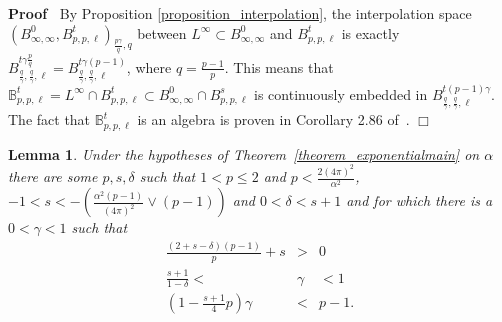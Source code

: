 \documentclass[a4paper,10pt]{article}
\newenvironment{proof}{\noindent\textbf{Proof\ }}{\hspace*{\fill}$\Box$\medskip}
\newtheorem{lemma}[theorem]{Lemma}
\begin{document}
\begin{proof}
  By Proposition \ref{proposition_interpolation}, the interpolation space
  $(B^0_{\infty, \infty}, B^t_{p, p, \ell})_{\frac{p \gamma}{q}, q}$ between
  $L^{\infty} \subset B^0_{\infty, \infty}$ and $B^t_{p, p, \ell}$ is exactly
  $B^{t \gamma \frac{p}{q}}_{\frac{q}{\gamma}, \frac{q}{\gamma}, \ell} = B^{t
  \gamma (p - 1)}_{\frac{q}{\gamma}, \frac{q}{\gamma}, \ell}$, where $q =
  \frac{p - 1}{p}$. This means that $\mathbb{B}^t_{p, p, \ell} = L^{\infty}
  \cap B^t_{p, p, \ell} \subset B^0_{\infty, \infty} \cap B^s_{p, p, \ell}$ is
  continuously embedded in $B^{t (p - 1) \gamma}_{\frac{q}{\gamma},
  \frac{q}{\gamma}, \ell}$. The fact that $\mathbb{B}_{p, p, \ell}^t$ is an
  algebra is proven in Corollary 2.86 of~{\cite{Bahouri2011}}.
\end{proof}

\begin{lemma}
  \label{lemma_gamma}Under the hypotheses of
  Theorem~\ref{theorem_exponentialmain} on $\alpha$ there are some $p, s,
  \delta$ such that $1 < p \leqslant 2$ and $p < \frac{2 (4
  \pi)^2}{\alpha^2}$, $- 1 < s < - \left( \frac{\alpha^2 (p - 1)}{(4 \pi)^2}
  \vee (p - 1) \right)$ and $0 < \delta < s + 1$ and for which there is a $0 <
  \gamma < 1$ such that
  \begin{eqnarray}
    \frac{(2 + s - \delta) (p - 1)}{p} + s & > & 0  \label{eq:gamma1}\\
    \frac{s + 1}{1 - \delta} < & \gamma & < 1  \label{eq:gamma2}\\
    \left( 1 - \frac{s + 1}{4} p \right) \gamma & < & p - 1. 
    \label{eq:gamma3}
  \end{eqnarray}
\end{lemma}
\end{document}
